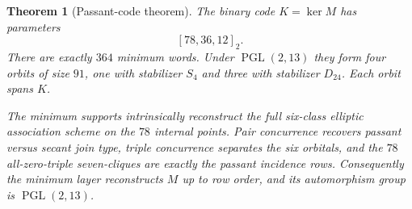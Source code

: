 \documentclass[11pt]{article}
\newtheorem{theorem}{Theorem}[section]
\theoremstyle{remark}
\begin{document}
\begin{theorem}[Passant-code theorem]
\label{thm:q13-tangent-code}
The binary code $K=\ker M$ has parameters
\[
 [78,36,12]_2.
\]
There are exactly $364$ minimum words.  Under
$\operatorname{PGL}(2,13)$ they form four orbits of size $91$, one with
stabilizer $S_4$ and three with stabilizer $D_{24}$.  Each orbit spans
$K$.

The minimum supports intrinsically reconstruct the full six-class
elliptic association scheme on the $78$ internal points.  Pair concurrence
recovers passant versus secant join type, triple concurrence separates the
six orbitals, and the $78$ all-zero-triple seven-cliques are exactly the
passant incidence rows.  Consequently the minimum layer reconstructs $M$
up to row order, and its automorphism group is
$\operatorname{PGL}(2,13)$.
\end{theorem}
\end{document}
